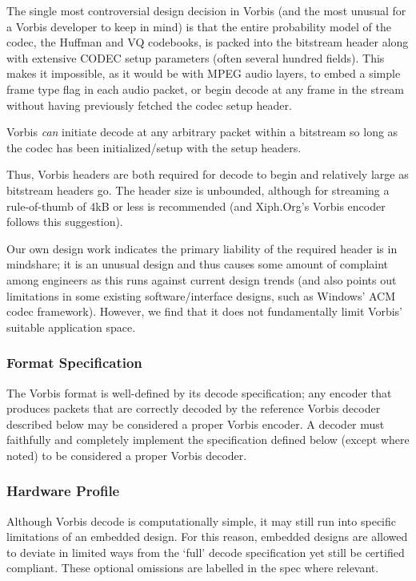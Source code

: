 The single most controversial design decision in Vorbis (and the most
unusual for a Vorbis developer to keep in mind) is that the entire
probability model of the codec, the Huffman and VQ codebooks, is
packed into the bitstream header along with extensive CODEC setup
parameters (often several hundred fields).  This makes it impossible,
as it would be with MPEG audio layers, to embed a simple frame type
flag in each audio packet, or begin decode at any frame in the stream
without having previously fetched the codec setup header.


\begin{note}
Vorbis \emph{can} initiate decode at any arbitrary packet within a
bitstream so long as the codec has been initialized/setup with the
setup headers.
\end{note}

Thus, Vorbis headers are both required for decode to begin and
relatively large as bitstream headers go.  The header size is
unbounded, although for streaming a rule-of-thumb of 4kB or less is
recommended (and Xiph.Org's Vorbis encoder follows this suggestion).

Our own design work indicates the primary liability of the
required header is in mindshare; it is an unusual design and thus
causes some amount of complaint among engineers as this runs against
current design trends (and also points out limitations in some
existing software/interface designs, such as Windows' ACM codec
framework).  However, we find that it does not fundamentally limit
Vorbis' suitable application space.


\subsubsection{Format Specification}
The Vorbis format is well-defined by its decode specification; any
encoder that produces packets that are correctly decoded by the
reference Vorbis decoder described below may be considered a proper
Vorbis encoder.  A decoder must faithfully and completely implement
the specification defined below (except where noted) to be considered
a proper Vorbis decoder.

\subsubsection{Hardware Profile}
Although Vorbis decode is computationally simple, it may still run
into specific limitations of an embedded design.  For this reason,
embedded designs are allowed to deviate in limited ways from the
`full' decode specification yet still be certified compliant.  These
optional omissions are labelled in the spec where relevant.


